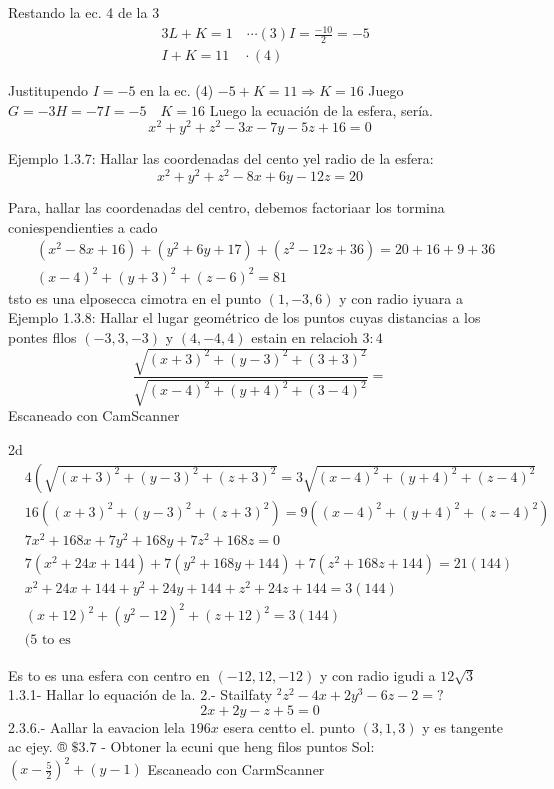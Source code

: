 

Restando la ec. 4 de la 3
$$
\begin{aligned}
	& 3 L+K=1 \quad \cdots(3) I=\frac{-10}{2}=-5 \\
	& I+K=11 \quad \cdot(4)
\end{aligned}
$$

Justitupendo $I=-5$ en la ec. (4)
$-5+K=11 \Rightarrow K=16$ Juego $G=-3 H=-7 I=-5 \quad K=16$ Luego la ecuación de la esfera, sería.
$$
x^2+y^2+z^2-3 x-7 y-5 z+16=0
$$

Ejemplo 1.3.7: Hallar las coordenadas del cento yel radio de la esfera:
$$
x^2+y^2+z^2-8 x+6 y-12 z=20
$$

Para, hallar las coordenadas del centro, debemos factoriaar los tormina coniespendienties a cado
$$
\begin{aligned}
	& \left(x^2-8 x+16\right)+\left(y^2+6 y+17\right)+\left(z^2-12 z+36\right)=20+16+9+36 \\
	& (x-4)^2+(y+3)^2+(z-6)^2=81
\end{aligned}
$$
tsto es una elposecca cimotra en el punto $(1,-3,6)$ y con radio iyuara a
Ejemplo 1.3.8: Hallar el lugar geométrico de los puntos cuyas distancias a los pontes fllos $(-3,3,-3)$ y $(4,-4,4)$ estain en relacioh $3: 4$
$$
\frac{\sqrt{(x+3)^2+(y-3)^2+(3+3)^2}}{\sqrt{(x-4)^2+(y+4)^2+(3-4)^2}}=
$$
Escaneado con CamScanner




2d
$$
\begin{aligned}
	& 4\left(\sqrt{(x+3)^2+(y-3)^2+(z+3)^2}=3 \sqrt{(x-4)^2+(y+4)^2+(z-4)^2}\right. \\
	& 16\left((x+3)^2+(y-3)^2+(z+3)^2\right)=9\left((x-4)^2+(y+4)^2+(z-4)^2\right) \\
	& 7 x^2+168 x+7 y^2+168 y+7 z^2+168 z=0 \\
	& 7\left(x^2+24 x+144\right)+7\left(y^2+168 y+144\right)+7\left(z^2+168 z+144\right)=21(144) \\
	& x^2+24 x+144+y^2+24 y+144+z^2+24 z+144=3(144) \\
	& (x+12)^2+\left(y^2-12\right)^2+(z+12)^2=3(144) \\
	& (5 \text { to es }
\end{aligned}
$$

Es to es una esfera con centro en $(-12,12,-12)$ y con radio igudi a $12 \sqrt{3}$
1.3.1- Hallar lo equación de la. 2.- Stailfaty ${ }^2 z^2-4 x+2 y^3-6 z-2=?$
$$
2 x+2 y-z+5=0
$$
2.3.6.- Aallar la eavacion lela $196 x$ esera centto el. punto $(3,1,3)$ y es tangente ac ejey.
® $\$ 3.7$ - Obtoner la ecuni que heng filos puntos Sol: $\left(x-\frac{5}{2}\right)^2+(y-1)$
Escaneado con CarmScanner


